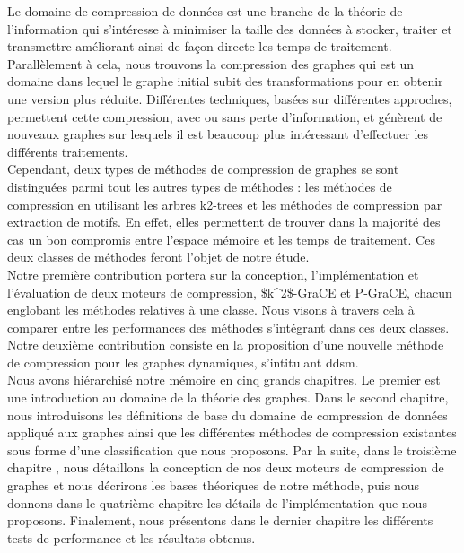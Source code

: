 \documentclass[a4paper,oneside,12pt]{report}
\theoremstyle{definition}
\begin{document}
	Le domaine de compression de données est une branche de la théorie de l'information qui s'intéresse à minimiser la taille des données à stocker, traiter et transmettre améliorant ainsi de façon directe les temps de traitement. Parallèlement à cela, nous trouvons la compression des graphes qui est un domaine dans lequel le graphe initial subit des transformations pour en obtenir une version plus réduite. Différentes techniques, basées sur différentes approches, permettent cette compression, avec ou sans perte d'information, et génèrent de nouveaux graphes sur lesquels il est beaucoup plus intéressant d'effectuer les différents traitements.\\ 

Cependant, deux types de méthodes de compression de graphes se sont distinguées parmi tout les autres types de méthodes : les méthodes de compression en utilisant les arbres k2-trees et les méthodes de compression par extraction de motifs. En effet, elles permettent de trouver dans la majorité des cas un bon compromis entre l'espace mémoire et les temps de traitement. Ces deux classes de méthodes feront l'objet de notre étude.\\
		
			Notre première contribution  portera sur la conception, l'implémentation et l'évaluation de 	deux moteurs de compression, 
			\gls{$k^2$-GraCE} 
			 et \gls{P-GraCE}, chacun englobant les méthodes relatives à une classe. Nous visons à travers cela à comparer entre les performances des méthodes s'intégrant dans ces deux classes. Notre deuxième contribution consiste en la proposition d'une nouvelle méthode de compression pour les graphes dynamiques, s'intitulant 
			 \gls{ddsm}. \\
			
			
			 Nous avons hiérarchisé notre mémoire en cinq grands chapitres. Le premier est une introduction au domaine de la théorie des graphes. Dans le second chapitre, nous introduisons les définitions de base du domaine de compression de données appliqué aux graphes ainsi que les différentes méthodes de compression existantes sous forme d'une classification que nous proposons. Par la suite, dans le troisième chapitre , nous détaillons la conception de nos deux moteurs de compression de graphes et nous décrirons les bases théoriques de notre méthode, puis nous donnons dans le quatrième chapitre  les détails de l'implémentation que nous proposons. Finalement, nous présentons dans le dernier chapitre les différents tests de performance et les résultats obtenus.
	
\end{document}
